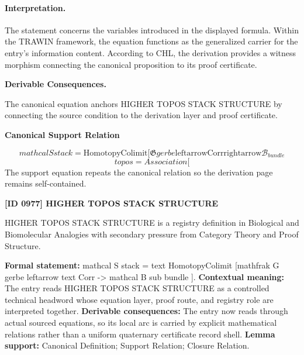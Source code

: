 \paragraph{Interpretation.}
The statement concerns the variables introduced in the displayed formula. Within the TRAWIN framework, the equation functions as the generalized carrier for the entry’s information content. According to CHL, the derivation provides a witness morphism connecting the canonical proposition to its proof certificate.

\par\vspace{0.35em}
\noindent\textbf{Derivable Consequences.}\quad
\begingroup
\footnotesize
\raggedright
The canonical equation anchors HIGHER TOPOS STACK STRUCTURE by connecting the source condition to the derivation layer and proof certificate.
\par\endgroup

\noindent\textbf{Canonical Support Relation}\par
\[
mathcal{S} {stack} = \text{HomotopyColimit}[\mathfrak{G} {gerbe} \mathrm{leftarrow} \text{Corr} \mathrm{rightarrow} \mathcal{B}_{bundle}
\]
\[
topos = Association[
\]
\noindent The support equation repeats the canonical relation so the derivation page remains self-contained.\par

\clearpage
\noindent\textbf{[ID 0977] HIGHER TOPOS STACK STRUCTURE}\par
\vspace{0.35em}
\begingroup\small
{}
HIGHER TOPOS STACK STRUCTURE is a registry definition in Biological and Biomolecular Analogies with secondary pressure from Category Theory and Proof Structure.

\begingroup\footnotesize\setlength{\emergencystretch}{3em}\sloppy
\textbf{Formal statement:} mathcal S stack = text HomotopyColimit [mathfrak G gerbe leftarrow text Corr -> mathcal B sub bundle ]. \textbf{Contextual meaning:} The entry reads HIGHER TOPOS STACK STRUCTURE as a controlled technical headword whose equation layer, proof route, and registry role are interpreted together. \textbf{Derivable consequences:} The entry now reads through actual sourced equations, so its local arc is carried by explicit mathematical relations rather than a uniform quaternary certificate record shell. \textbf{Lemma support:} Canonical Definition; Support Relation; Closure Relation.\par
\endgroup

